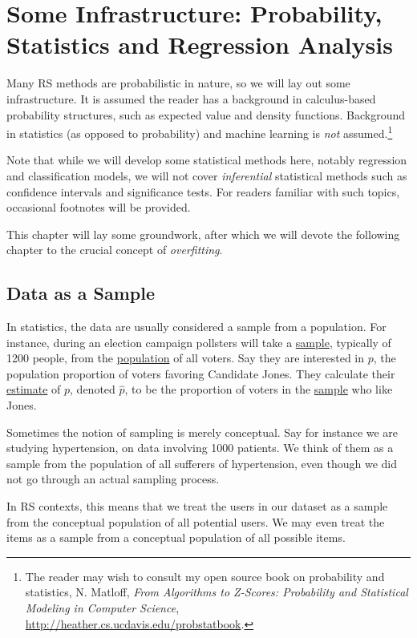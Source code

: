 \chapter{Some Infrastructure: Probability, Statistics and Regression
Analysis}
\label{chap:infra2}

Many RS methods are probabilistic in nature, so we will lay out some
infrastructure.  It is assumed the reader has a background in
calculus-based probability structures, such as expected value and
density functions.  Background in statistics (as opposed to probability)
and machine learning is \textit{not} assumed.\footnote{The reader may
wish to consult my open source book on probability and statistics, N.
Matloff, \textit{From Algorithms to Z-Scores: Probability and
Statistical Modeling in Computer Science},
\url{http://heather.cs.ucdavis.edu/probstatbook}.}

Note that while we will develop some statistical methods here, notably
regression and classification models, we will not cover
\textit{inferential} statistical methods such as confidence intervals
and significance tests.  For readers familiar with such topics,
occasional footnotes will be provided. 

This chapter will lay some groundwork, after which we will devote the
following chapter to the crucial concept of \textit{overfitting}.  

\section{Data as a Sample}

In statistics, the data are usually considered a sample from a
population.  For instance, during an election campaign pollsters will
take a \underline{sample}, typically of 1200 people, from the
\underline{population} of all voters.  Say they are interested in $p$,
the population proportion of voters favoring Candidate Jones. They
calculate their \underline{estimate} of $p$, denoted $\widehat{p}$, to
be the proportion of voters in the \underline{sample} who like Jones.

Sometimes the notion of sampling is merely conceptual. Say for instance
we are studying hypertension, on data involving 1000 patients.  We think
of them as a sample from the population of all sufferers of
hypertension, even though we did not go through an actual sampling
process.

In RS contexts, this means that we treat the users in our dataset as a
sample from the conceptual population of all potential users.  We may
even treat the items as a sample from a conceptual population of all
possible items.

